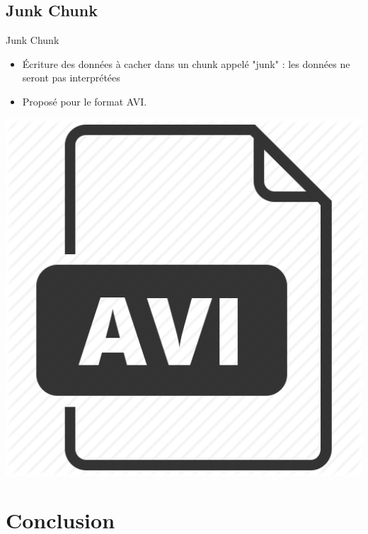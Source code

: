 \documentclass{beamer}
\begin{document}
    \subsection{Junk Chunk}
    \begin{frame}
    
	\begin{block}{Junk Chunk}
	\begin{itemize}
	[circle]
	\item Écriture des données à cacher dans un chunk appelé "junk" : les 
	données ne seront pas interprétées  
	\item Proposé pour le format AVI. 
	\end{itemize}
	\end{block}
	
	\hspace{4.4cm}
    \includegraphics[scale=0.08]{pictures/avi-512.png}
    
    \end{frame}

  \section{Conclusion}
  
\end{document}

